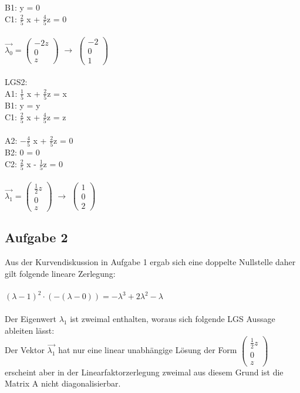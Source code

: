 \documentclass{article}
\begin{document}
	B1: y = 0\\
	C1: $\frac{2}{5}$ x + $\frac{4}{5}$z = 0 \\ \\
	$\vec{\lambda_{0}} =
	\left(
	\begin{array}{c}
	-2z\\0\\z
	\end{array}
	\right)$ 
	$\to$
	$\left(
	\begin{array}{c}
	-2\\0\\1
	\end{array}
	\right)$
	\\ \\
	LGS2: \\
	A1: $\frac{1}{5}$ x + $\frac{2}{5}$z = x \\
	B1: y = y\\
	C1: $\frac{2}{5}$ x + $\frac{4}{5}$z = z \\ \\
	A2: $-\frac{4}{5}$ x + $\frac{2}{5}$z = 0 \\
	B2: 0 = 0\\
	C2: $\frac{2}{5}$ x - $\frac{1}{5}$z = 0 \\ \\
	$\vec{\lambda_{1}} =
	\left(
	\begin{array}{c}
	\frac{1}{2}z\\0\\z
	\end{array}
	\right)$ $\to$
	$
	\left(
	\begin{array}{c}
	1\\0\\2
	\end{array}
	\right)$
	\subsection*{Aufgabe 2}
	Aus der Kurvendiskussion in Aufgabe 1 ergab sich eine doppelte Nullstelle daher gilt folgende lineare Zerlegung: \\ \\
	$(\lambda - 1)^{2} \cdot (-(\lambda-0)) = -\lambda^{3} + 2\lambda^{2} - \lambda$ \\ \\
	Der Eigenwert $\lambda_{1}$ ist zweimal enthalten, woraus sich folgende LGS Aussage ableiten lässt: \\
	Der Vektor $\vec{\lambda_{1}}$ hat nur eine linear unabhängige Lösung der Form
	$\left(
	\begin{array}{c}
	\frac{1}{2}z  \\ 0 \\ z
	\end{array}
	\right)$
	erscheint aber in der Linearfaktorzerlegung zweimal aus diesem Grund ist die Matrix A nicht diagonalisierbar. 
\end{document}

